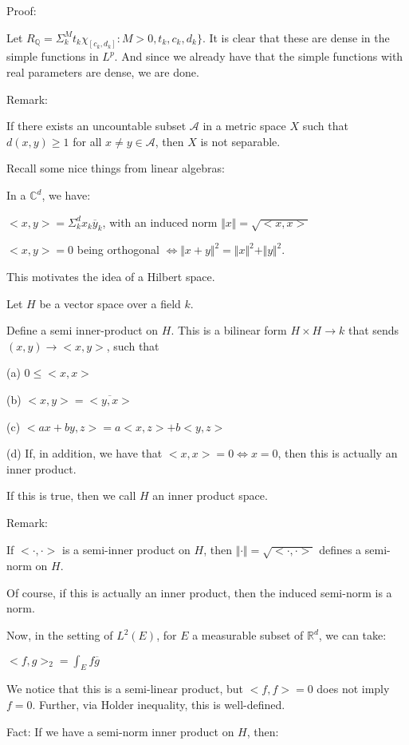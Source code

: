 \documentclass[10pt]{article}
\begin{document}
Proof:

Let $R_{\mathbb{Q}} = \Sigma_k^M t_k \chi_{[c_k,d_k]} : M > 0, t_k, c_k, d_k \}$. It is clear that these are dense in the simple functions in $L^p$. And since we already have that the simple functions with real parameters are dense, we are done.

Remark:

If there exists an uncountable subset $\mathcal{A}$ in a metric space $X$ such that $d(x,y) \geq 1$ for all $x\not = y \in \mathcal{A}$, then $X$ is not separable.

Recall some nice things from linear algebras:

In a $\mathbb{C}^d$, we have:

$<x,y> = \Sigma_k^d x_k \overline{y}_k$, with an induced norm $\Vert x \Vert = \sqrt{<x,x>}$

$<x,y> = 0$ being orthogonal $\iff \Vert x + y \Vert^2 = \Vert x \Vert^2 + \Vert y \Vert^2$.

This motivates the idea of a Hilbert space.

Let $H$ be a vector space over a field $k$. 

Define a semi inner-product on $H$. This is a bilinear form $ H \times H \to k$ that sends $(x,y) \to <x,y>$, such that 

(a) $0 \leq <x,x>$

(b) $<x,y> = \overline{<y,x>}$

(c) $<ax + by,z> = a<x,z> + b<y,z>$

(d) If, in addition, we have that $<x,x> = 0 \iff x = 0$, then this is actually an inner product.

If this is true, then we call $H$ an inner product space.

Remark:

If $< \cdot , \cdot >$ is a semi-inner product on $H$, then $\Vert \cdot \Vert = \sqrt{< \cdot , \cdot>}$ defines a semi-norm on $H$.

Of course, if this is actually an inner product, then the induced semi-norm is a norm.

Now, in the setting of $L^2(E)$, for $E$ a measurable subset of $\mathbb{R}^d$, we can take:

$<f,g>_2 = \int_E f \overline{g}$

We notice that this is a semi-linear product, but $<f,f> =0$ does not imply $f = 0$. Further, via Holder inequality, this is well-defined.

Fact: If we have a semi-norm inner product on $H$, then:
\end{document}
